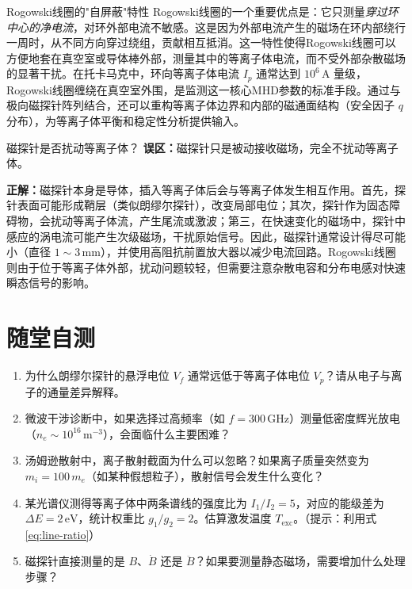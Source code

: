 \begin{insight}{Rogowski线圈的"自屏蔽"特性}{}{}
Rogowski线圈的一个重要优点是：它只测量\emph{穿过环中心的净电流}，对环外部电流不敏感。这是因为外部电流产生的磁场在环内部绕行一周时，从不同方向穿过绕组，贡献相互抵消。这一特性使得Rogowski线圈可以方便地套在真空室或导体棒外部，测量其中的等离子体电流，而不受外部杂散磁场的显著干扰。在托卡马克中，环向等离子体电流 $I_p$ 通常达到 $10^6\,\mathrm{A}$ 量级，Rogowski线圈缠绕在真空室外围，是监测这一核心MHD参数的标准手段。通过与极向磁探针阵列结合，还可以重构等离子体边界和内部的磁通面结构（安全因子 $q$ 分布），为等离子体平衡和稳定性分析提供输入。
\end{insight}

\begin{warning}{磁探针是否扰动等离子体？}{}{}
\textbf{误区：}磁探针只是被动接收磁场，完全不扰动等离子体。

\textbf{正解：}磁探针本身是导体，插入等离子体后会与等离子体发生相互作用。首先，探针表面可能形成鞘层（类似朗缪尔探针），改变局部电位；其次，探针作为固态障碍物，会扰动等离子体流，产生尾流或激波；第三，在快速变化的磁场中，探针中感应的涡电流可能产生次级磁场，干扰原始信号。因此，磁探针通常设计得尽可能小（直径 $1\sim 3\,\mathrm{mm}$），并使用高阻抗前置放大器以减少电流回路。Rogowski线圈则由于位于等离子体外部，扰动问题较轻，但需要注意杂散电容和分布电感对快速瞬态信号的影响。
\end{warning}


\section*{随堂自测}

\begin{miniquiz}
\begin{enumerate}
    \item 为什么朗缪尔探针的悬浮电位 $V_f$ 通常远低于等离子体电位 $V_p$？请从电子与离子的通量差异解释。
    
    \item 微波干涉诊断中，如果选择过高频率（如 $f = 300\,\mathrm{GHz}$）测量低密度辉光放电（$n_e \sim 10^{16}\,\mathrm{m}^{-3}$），会面临什么主要困难？
    
    \item 汤姆逊散射中，离子散射截面为什么可以忽略？如果离子质量突然变为 $m_i = 100\,m_e$（如某种假想粒子），散射信号会发生什么变化？
    
    \item 某光谱仪测得等离子体中两条谱线的强度比为 $I_1/I_2 = 5$，对应的能级差为 $\Delta E = 2\,\mathrm{eV}$，统计权重比 $g_1/g_2 = 2$。估算激发温度 $T_{\mathrm{exc}}$。（提示：利用式\eqref{eq:line-ratio}）
    
    \item 磁探针直接测量的是 $B$、$\dot{B}$ 还是 $\ddot{B}$？如果要测量静态磁场，需要增加什么处理步骤？
\end{enumerate}
\end{miniquiz}

